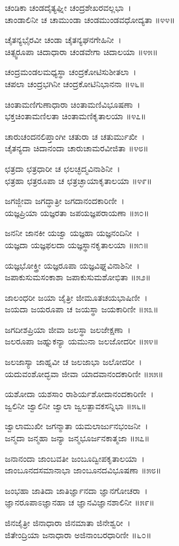 ಚಂಡಿಕಾ ಚಂಡದೈತ್ಯಘ್ನೀ ಚಂದ್ರಶೇಖರವಲ್ಲಭಾ~।\\
ಚಾಂಡಾಲಿನೀ ಚ ಚಾಮುಂಡಾ ಚಂಡಮುಂಡವಧೋದ್ಯತಾ ॥೪೪॥

ಚೈತನ್ಯಭೈರವೀ ಚಂಡಾ ಚೈತನ್ಯಘನಗೇಹಿನೀ~।\\
ಚಿತ್ಸ್ವರೂಪಾ ಚಿದಾಧಾರಾ ಚಂಡವೇಗಾ ಚಿದಾಲಯಾ ॥೪೫॥

ಚಂದ್ರಮಂಡಲಮಧ್ಯಸ್ಥಾ ಚಂದ್ರಕೋಟಿಸುಶೀತಲಾ~।\\
ಚಪಲಾ ಚಂದ್ರಭಗಿನೀ ಚಂದ್ರಕೋಟಿನಿಭಾನನಾ ॥೪೬॥

ಚಿಂತಾಮಣಿಗುಣಾಧಾರಾ ಚಿಂತಾಮಣಿವಿಭೂಷಣಾ~।\\
ಭಕ್ತಚಿಂತಾಮಣಿಲತಾ ಚಿಂತಾಮಣಿಕೃತಾಲಯಾ ॥೪೭॥

ಚಾರುಚಂದನಲಿಪ್ತಾಂಗೀ ಚತುರಾ ಚ ಚತುರ್ಮುಖೀ~।\\
ಚೈತನ್ಯದಾ ಚಿದಾನಂದಾ ಚಾರುಚಾಮರವೀಜಿತಾ ॥೪೮॥

ಛತ್ರದಾ ಛತ್ರಧಾರೀ ಚ ಛಲಚ್ಛದ್ಮವಿನಾಶಿನೀ~।\\
ಛತ್ರಹಾ ಛತ್ರರೂಪಾ ಚ ಛತ್ರಚ್ಛಾಯಾಕೃತಾಲಯಾ ॥೪೯॥

ಜಗಜ್ಜೀವಾ ಜಗದ್ಧಾತ್ರೀ ಜಗದಾನಂದಕಾರಿಣೀ~।\\
ಯಜ್ಞಪ್ರಿಯಾ ಯಜ್ಞರತಾ ಜಪಯಜ್ಞಪರಾಯಣಾ ॥೫೦॥

ಜನನೀ ಜಾನಕೀ ಯಜ್ವಾ ಯಜ್ಞಹಾ ಯಜ್ಞನಂದಿನೀ~।\\
ಯಜ್ಞದಾ ಯಜ್ಞಫಲದಾ ಯಜ್ಞಸ್ಥಾನಕೃತಾಲಯಾ ॥೫೧॥

ಯಜ್ಞಭೋಕ್ತ್ರೀ ಯಜ್ಞರೂಪಾ ಯಜ್ಞವಿಘ್ನವಿನಾಶಿನೀ~।\\
ಜಪಾಕುಸುಮಸಂಕಾಶಾ ಜಪಾಕುಸುಮಶೋಭಿತಾ ॥೫೨॥

ಜಾಲಂಧರೀ ಜಯಾ ಜೈತ್ರೀ ಜೀಮೂತಚಯಭಾಷಿಣೀ~।\\
ಜಯದಾ ಜಯರೂಪಾ ಚ ಜಯಸ್ಥಾ ಜಯಕಾರಿಣೀ ॥೫೩॥

ಜಗದೀಶಪ್ರಿಯಾ ಜೀವಾ ಜಲಸ್ಥಾ ಜಲಜೇಕ್ಷಣಾ~।\\
ಜಲರೂಪಾ ಜಹ್ನುಕನ್ಯಾ ಯಮುನಾ ಜಲಜೋದರೀ ॥೫೪॥

ಜಲಜಾಸ್ಯಾ ಜಾಹ್ನವೀ ಚ ಜಲಜಾಭಾ ಜಲೋದರೀ~।\\
ಯದುವಂಶೋದ್ಭವಾ ಜೀವಾ ಯಾದವಾನಂದಕಾರಿಣೀ ॥೫೫॥

ಯಶೋದಾ ಯಶಸಾಂ ರಾಶಿರ್ಯಶೋದಾನಂದಕಾರಿಣೀ~।\\
ಜ್ವಲಿನೀ ಜ್ವಾಲಿನೀ ಜ್ವಾಲಾ ಜ್ವಲತ್ಪಾವಕಸನ್ನಿಭಾ ॥೫೬॥

ಜ್ವಾಲಾಮುಖೀ ಜಗನ್ಮಾತಾ ಯಮಲಾರ್ಜುನಭಂಜನೀ~।\\
ಜನ್ಮದಾ ಜನ್ಮಹಾ ಜನ್ಯಾ ಜನ್ಮಭೂರ್ಜನಕಾತ್ಮಜಾ ॥೫೭॥

ಜನಾನಂದಾ ಜಾಂಬವತೀ ಜಂಬೂದ್ವೀಪಕೃತಾಲಯಾ~।\\
ಜಾಂಬೂನದಸಮಾನಾಭಾ ಜಾಂಬೂನದವಿಭೂಷಣಾ ॥೫೮॥

ಜಂಭಹಾ ಜಾತಿದಾ ಜಾತಿರ್ಜ್ಞಾನದಾ ಜ್ಞಾನಗೋಚರಾ~।\\
ಜ್ಞಾನರೂಪಾಽಜ್ಞಾನಹಾ ಚ ಜ್ಞಾನವಿಜ್ಞಾನಶಾಲಿನೀ ॥೫೯॥

ಜಿನಜೈತ್ರೀ ಜಿನಾಧಾರಾ ಜಿನಮಾತಾ ಜಿನೇಶ್ವರೀ~।\\
ಜಿತೇಂದ್ರಿಯಾ ಜನಾಧಾರಾ ಅಜಿನಾಂಬರಧಾರಿಣೀ ॥೬೦॥

